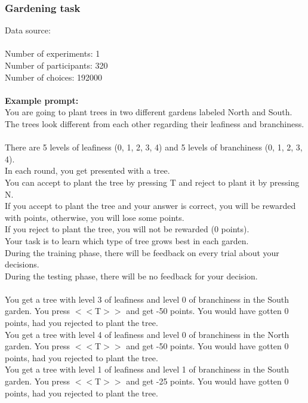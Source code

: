 \documentclass[pdflatex,sn-nature]{sn-jnl}%
\theoremstyle{thmstyleone}%
\theoremstyle{thmstyletwo}%
\theoremstyle{thmstylethree}%
\begin{document}
\subsubsection*{Gardening task}
Data source: \cite{flesch2018comparing}  \\ $~$ \\
Number of experiments: 1 $~$\\ 
Number of participants: 320 $~$\\ 
Number of choices: 192000 $~$\\ 
 $~$\\ 
\textbf{Example prompt:}
 $~$\\ 
You are going to plant trees in two different gardens labeled North and South. $~$\\ 
The trees look different from each other regarding their leafiness and branchiness. $~$\\ 
There are 5 levels of leafiness (0, 1, 2, 3, 4) and 5 levels of branchiness (0, 1, 2, 3, 4). $~$\\ 
In each round, you get presented with a tree. $~$\\ 
You can accept to plant the tree by pressing T and reject to plant it by pressing N. $~$\\ 
If you accept to plant the tree and your answer is correct, you will be rewarded with points, otherwise, you will lose some points. $~$\\ 
If you reject to plant the tree, you will not be rewarded (0 points). $~$\\ 
Your task is to learn which type of tree grows best in each garden. $~$\\ 
During the training phase, there will be feedback on every trial about your decisions. $~$\\ 
During the testing phase, there will be no feedback for your decision. $~$\\ 
 $~$\\ 
You get a tree with level 3 of leafiness and level 0 of branchiness in the South garden. You press $<<$T$>>$ and get -50 points. You would have gotten 0 points, had you rejected to plant the tree. $~$\\ 
You get a tree with level 4 of leafiness and level 0 of branchiness in the North garden. You press $<<$T$>>$ and get -50 points. You would have gotten 0 points, had you rejected to plant the tree. $~$\\ 
You get a tree with level 1 of leafiness and level 1 of branchiness in the South garden. You press $<<$T$>>$ and get -25 points. You would have gotten 0 points, had you rejected to plant the tree. $~$\\ 
\end{document}
